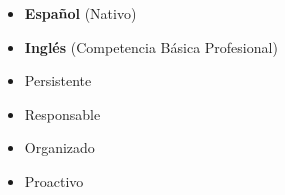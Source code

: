 %
%
%

\twocolumnsection
{
	\begin{itemize}
		\item \textbf{Español} (Nativo)
		\item \textbf{Inglés} (Competencia Básica Profesional)
	\end{itemize}
}
{
\vspace{1em}
	\begin{itemize}
		\item Persistente
		\item Responsable
		\item Organizado
		\item Proactivo
	\end{itemize}
}
